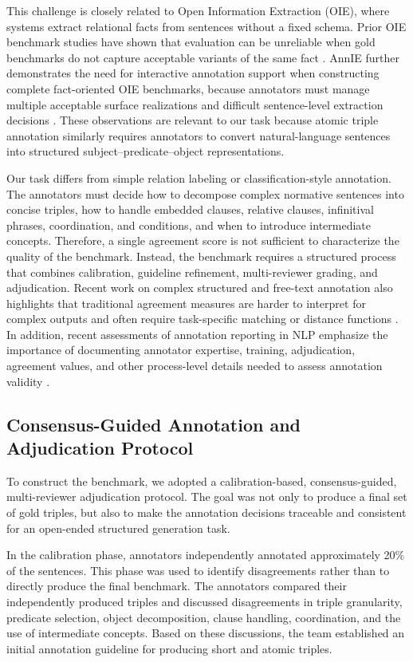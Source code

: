 \documentclass[conference]{IEEEtran}
\begin{document}
This challenge is closely related to Open Information Extraction (OIE), where systems extract relational facts from sentences without a fixed schema. Prior OIE benchmark studies have shown that evaluation can be unreliable when gold benchmarks do not capture acceptable variants of the same fact \cite{gashteovski2021benchie}. AnnIE further demonstrates the need for interactive annotation support when constructing complete fact-oriented OIE benchmarks, because annotators must manage multiple acceptable surface realizations and difficult sentence-level extraction decisions \cite{friedrich2022annie}. These observations are relevant to our task because atomic triple annotation similarly requires annotators to convert natural-language sentences into structured subject--predicate--object representations.

Our task differs from simple relation labeling or classification-style annotation. The annotators must decide how to decompose complex normative sentences into concise triples, how to handle embedded clauses, relative clauses, infinitival phrases, coordination, and conditions, and when to introduce intermediate concepts. Therefore, a single agreement score is not sufficient to characterize the quality of the benchmark. Instead, the benchmark requires a structured process that combines calibration, guideline refinement, multi-reviewer grading, and adjudication. Recent work on complex structured and free-text annotation also highlights that traditional agreement measures are harder to interpret for complex outputs and often require task-specific matching or distance functions \cite{braylan2022measuring}. In addition, recent assessments of annotation reporting in NLP emphasize the importance of documenting annotator expertise, training, adjudication, agreement values, and other process-level details needed to assess annotation validity \cite{kunilovskaya2026who}.

\subsection{Consensus-Guided Annotation and Adjudication Protocol}

To construct the benchmark, we adopted a calibration-based, consensus-guided, multi-reviewer adjudication protocol. The goal was not only to produce a final set of gold triples, but also to make the annotation decisions traceable and consistent for an open-ended structured generation task.

In the calibration phase, annotators independently annotated approximately 20\% of the sentences. This phase was used to identify disagreements rather than to directly produce the final benchmark. The annotators compared their independently produced triples and discussed disagreements in triple granularity, predicate selection, object decomposition, clause handling, coordination, and the use of intermediate concepts. Based on these discussions, the team established an initial annotation guideline for producing short and atomic triples.
\end{document}
